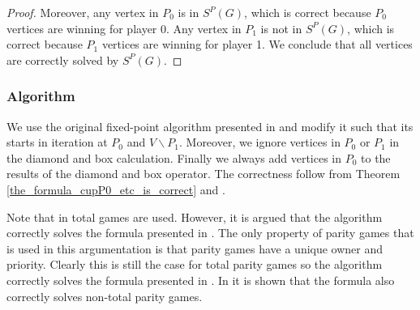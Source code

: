\begin{theorem}
\begin{proof}
		Moreover, any vertex in $P_0$ is in $S^P(G)$, which is correct because $P_0$ vertices are winning for player 0. Any vertex in $P_1$ is not in $S^P(G)$, which is correct because $P_1$ vertices are winning for player 1. We conclude that all vertices are correctly solved by $S^P(G)$.
	\end{proof}
\end{theorem}

\subsubsection{Algorithm}
We use the original fixed-point algorithm presented in \cite{FPITE} and modify it such that its starts in iteration at $P_0$ and $V\backslash P_1$. Moreover, we ignore vertices in $P_0$ or $P_1$ in the diamond and box calculation. Finally we always add vertices in $P_0$ to the results of the diamond and box operator. The correctness follow from Theorem \ref{the_formula_cupP0_etc_is_correct} and \cite{FPITE,WALUKIEWICZ2002311}.

Note that in \cite{FPITE} total games are used. However, it is argued that the algorithm correctly solves the formula presented in \cite{WALUKIEWICZ2002311}. The only property of parity games that is used in this argumentation is that parity games have a unique owner and priority. Clearly this is still the case for total parity games so the algorithm correctly solves the formula presented in \cite{WALUKIEWICZ2002311}. In \cite{WALUKIEWICZ2002311} it is shown that the formula also correctly solves non-total parity games.

